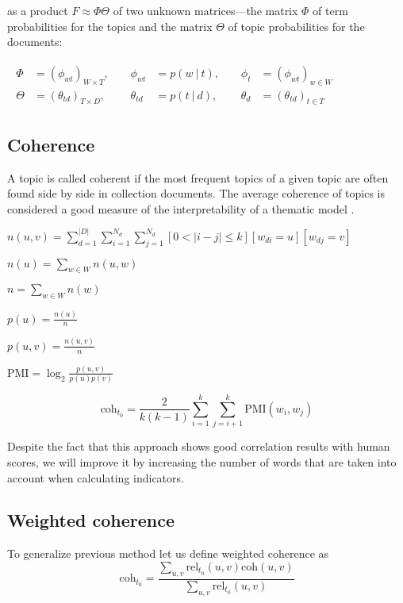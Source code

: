 \documentclass{article}
\begin{document}
as a product $F \approx \Phi \Theta $ of two unknown matrices—the matrix $\Phi$ of term probabilities for the topics and the matrix $\Theta$ of topic probabilities for the documents:

$\begin{aligned} \begin{array}{rlrlrl} \Phi &{}= (\phi _{wt})_{W{\times }T},\;\;\;\; &{} \phi _{wt} &{}= p(w\ {\vert }\ t),\;\;\;\; &{} \phi _t &{}= (\phi _{wt})_{w\in W} \\ \Theta &{}= (\theta _{td})_{T{\times }D},\;\;\;\; &{} \theta _{td} &{}= p(t\ {\vert }\ d),\;\;\;\; &{} \theta _d &{}= (\theta _{td})_{t\in T}\end{array} \end{aligned}$

\subsection{Coherence}

A topic is called coherent if the most frequent topics of a given topic are often found side by side in collection documents. 
The average coherence of topics is considered a good measure of the interpretability of a thematic model \cite{newman-etal-2010-automatic}.

$n(u, v) = \sum\limits_{d = 1}^{|D|} \sum\limits_{i = 1}^{N_d} \sum\limits_{j = 1}^{N_d} [0 < |i - j| \leq k] [w_{di} = u] [w_{dj} = v]$

$n(u) = \sum\limits_{w \in W}{n(u, w)}$

$n = \sum\limits_{w \in W}{n(w)}$

$p(u) = \frac{n(u)}{n}$

$p(u, v) = \frac{n(u, v)}{n}$

$\text{PMI} = \log_2 \frac {p(u, v)} {p(u) p(v)}$

\[
\text{coh}_{t_0} = \frac {2} {k (k - 1)} \sum_{i = 1}^{k} \sum_{j = i+1}^{k} \text{PMI}(w_i, w_j)
\]

Despite the fact that this approach shows good correlation results with human scores, we will improve it by increasing the number of words that are taken into account when calculating indicators.

\subsection{Weighted coherence}

To generalize previous method let us define weighted coherence as 
\[
\text{coh}_{t_0} = \frac {\sum_{u, v} \text{rel}_{t_0}(u, v) \text{coh}(u, v)} {\sum_{u, v}  \text{rel}_{t_0}(u, v)}
\]
\end{document}
